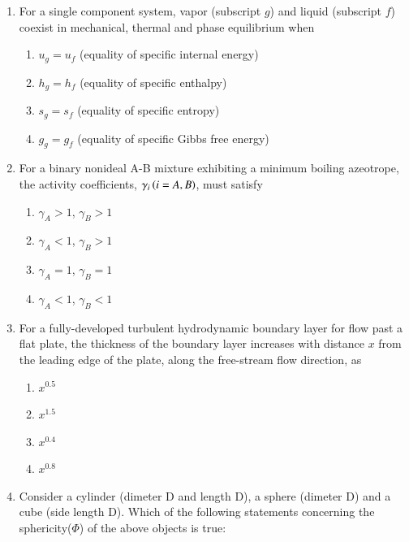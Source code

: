 \documentclass[journal,12pt,onecolumn]{IEEEtran}
\theoremstyle{remark}
\begin{document}
\begin{enumerate}
    

    \item For a single component system, vapor (subscript $g$) and liquid (subscript $f$) coexist in mechanical, thermal and phase equilibrium when 
    
 \hfill{}
\begin{enumerate}
    \item $u_g = u_f$ (equality of specific internal energy)
    \item $h_g = h_f$ (equality of specific enthalpy)
    \item $s_g = s_f$ (equality of specific entropy)
    \item $g_g = g_f$ (equality of specific Gibbs free energy)
\end{enumerate}

    \item  For a binary nonideal A-B mixture exhibiting a minimum boiling azeotrope, the activity coefficients, $\gamma_i\left(i = A,B\right)$, must satisfy
    
 \hfill{}
\begin{enumerate}
    \item $\gamma_A > 1$, $\gamma_B > 1$
    \item $\gamma_A < 1$, $\gamma_B > 1$
    \item $\gamma_A = 1$, $\gamma_B = 1$
    \item $\gamma_A < 1$, $\gamma_B < 1$
\end{enumerate}

    \item For a fully-developed turbulent hydrodynamic boundary layer for flow past a flat plate, the thickness of the boundary layer increases with distance $x$ from the leading edge of the plate, along the free-stream flow direction, as
    
     \hfill{}
\begin{multicols}{4}
    \begin{enumerate}
        \item $x^{0.5}$
        \item $x^{1.5}$
        \item $x^{0.4}$
        \item $x^{0.8}$
    \end{enumerate}
\end{multicols}

    \item Consider a cylinder (dimeter D and length D), a sphere (dimeter D) and a cube (side length D). Which of the following statements concerning the sphericity($\Phi$) of the above objects is true:
    

\end{enumerate}
\end{document}
